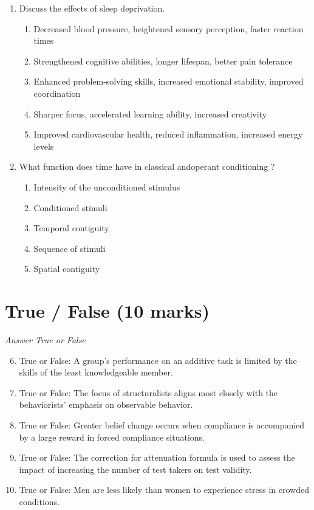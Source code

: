 \documentclass[12pt]{article}
\begin{document}
\begin{enumerate}[label=\arabic*.]
\begin{enumerate}[label=(\alph*)]
\end{enumerate}
\item Discuss the effects of sleep deprivation.
\begin{enumerate}[label=(\alph*)]
    \item Decreased blood pressure, heightened sensory perception, faster reaction times
    \item Strengthened cognitive abilities, longer lifespan, better pain tolerance
    \item Enhanced problem-solving skills, increased emotional stability, improved coordination
    \item Sharper focus, accelerated learning ability, increased creativity
    \item Improved cardiovascular health, reduced inflammation, increased energy levels
\end{enumerate}
\item What function does time have in classical andoperant conditioning ?
\begin{enumerate}[label=(\alph*)]
    \item Intensity of the unconditioned stimulus
    \item Conditioned stimuli
    \item Temporal contiguity
    \item Sequence of stimuli
    \item Spatial contiguity
\end{enumerate}
\end{enumerate}

\section*{True / False (10 marks)}
\textit{Answer True or False}
\begin{enumerate}[label=\arabic*.]
\setcounter{enumi}{5}
\item True or False: A group's performance on an additive task is limited by the skills of the least knowledgeable member.
\item True or False: The focus of structuralists aligns most closely with the behaviorists' emphasis on observable behavior.
\item True or False: Greater belief change occurs when compliance is accompanied by a large reward in forced compliance situations.
\item True or False: The correction for attenuation formula is used to assess the impact of increasing the number of test takers on test validity.
\item True or False: Men are less likely than women to experience stress in crowded conditions.
\end{enumerate}
\end{document}
